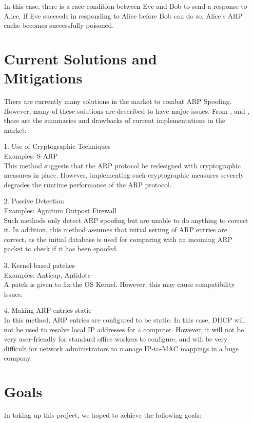 \documentclass{acm_proc_article-sp}
\begin{document}
In this case, there is a race condition between Eve and Bob to send a response to Alice. If Eve succeeds in responding to Alice before Bob can do so, Alice's ARP cache becomes successfully poisoned. 

\section{Current Solutions and \\Mitigations}
There are currently many solutions in the market to combat ARP Spoofing. However, many of these solutions are described to have major issues. From \cite{vivek:arp}, \cite{navid:arp2} and \cite{goldendeep:arp3},  these are the summaries and drawbacks of current implementations in the market:

1. Use of Cryptographic Techniques \\
Examples: S-ARP \\
This method suggests that the ARP protocol be redesigned with cryptographic measures in place. However, implementing such cryptographic measures severely degrades the runtime performance of the ARP protocol. 

2. Passive Detection \\
Examples: Agnitum Outpost Firewall\\
Such methods only detect ARP spoofing but are unable to do anything to correct it. In addition, this method assumes that initial setting of ARP entries are correct, as the initial database is used for comparing with an incoming ARP packet to check if it has been spoofed. 

3. Kernel-based patches\\
Examples: Anticap, Antidote \\
A patch is given to fix the OS Kernel. However, this may cause compatibility issues. 

4. Making ARP entries static\\ 
In this method, ARP entries are configured to be static. In this case, DHCP will not be used to resolve local IP addresses for a computer. However, it will not be very user-friendly for standard office workers to configure, and will be very difficult for network administrators to manage IP-to-MAC mappings in a huge company. 


\section{Goals}
In taking up this project, we hoped to achieve the following goals: 
\end{document}
